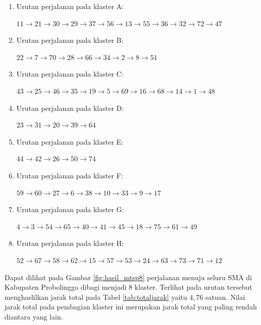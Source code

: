 \begin{enumerate}
\item Urutan perjalanan pada klaster A:

$11\rightarrow21\rightarrow30\rightarrow29\rightarrow37\rightarrow56\rightarrow13\rightarrow55\rightarrow36\rightarrow32\rightarrow72\rightarrow47$

\item Urutan perjalanan pada klaster B:

$22\rightarrow7\rightarrow70\rightarrow28\rightarrow66\rightarrow34\rightarrow2\rightarrow8\rightarrow51$

\item Urutan perjalanan pada klaster C:

$43\rightarrow25\rightarrow46\rightarrow35\rightarrow19\rightarrow5\rightarrow69\rightarrow16\rightarrow68\rightarrow14\rightarrow1\rightarrow48$

\item Urutan perjalanan pada klaster D:

$23\rightarrow31\rightarrow20\rightarrow39\rightarrow64$

\item Urutan perjalanan pada klaster E:

$44\rightarrow42\rightarrow26\rightarrow50\rightarrow74$

\item Urutan perjalanan pada klaster F:

$59\rightarrow60\rightarrow27\rightarrow6\rightarrow38\rightarrow10\rightarrow33\rightarrow9\rightarrow17$

\item Urutan perjalanan pada klaster G:

$4\rightarrow3\rightarrow54\rightarrow65\rightarrow40\rightarrow41\rightarrow45\rightarrow18\rightarrow75\rightarrow61\rightarrow49$

\item Urutan perjalanan pada klaster H:

$52\rightarrow67\rightarrow58\rightarrow62\rightarrow15\rightarrow57\rightarrow53\rightarrow24\rightarrow63\rightarrow73\rightarrow71\rightarrow12$
\end{enumerate}

Dapat dilihat pada Gambar \ref{fig:hasil_mtsp8} perjalanan menuju seluru SMA di Kabupaten Probolinggo dibagi menjadi 8 klaster. Terlihat pada urutan tersebut menghaslilkan jarak total pada Tabel \ref{tab:totaljarak} yaitu $4,76$ satuan. Nilai jarak total pada pembagian klaster ini merupakan jarak total yang paling rendah diantara yang lain.

